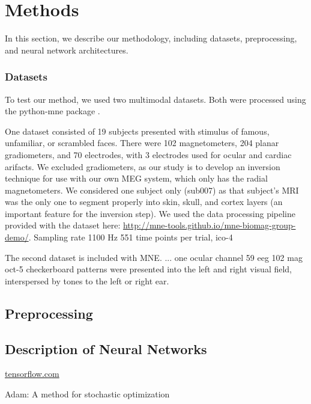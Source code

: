 \documentclass[journal]{IEEEtran}
\begin{document}
\section{Methods}

In this section, we describe our methodology, including datasets, preprocessing, and neural network architectures.

\subsubsection{Datasets}

To test our method, we used two multimodal datasets. Both were processed using the python-mne package \cite{gramfort2014mne}.

One dataset \cite{wakeman2015multi} consisted of 19 subjects presented with stimulus of famous, unfamiliar, or scrambled faces. There were 102 magnetometers, 204 planar gradiometers, and 70 electrodes, with 3 electrodes used for ocular and cardiac arifacts. We excluded gradiometers, as our study is to develop an inversion technique for use with our own MEG system, which only has the radial magnetometers. We considered one subject only (sub007) as that subject's MRI was the only one to segment properly into skin, skull, and cortex layers (an important feature for the inversion step). We used the data processing pipeline provided with the dataset here: \url{http://mne-tools.github.io/mne-biomag-group-demo/}. Sampling rate 1100 Hz 551 time points per trial, ico-4

The second dataset \cite{gramfort2013meg} is included with MNE. ... one ocular channel 59 eeg 102 mag oct-5 checkerboard patterns were presented into the left and right visual field, interspersed by tones to the left or right ear. 

\subsection{Preprocessing}
\subsection{Description of Neural Networks}
\url{tensorflow.com}
\cite{kingma2014adam}

Adam: A method for stochastic optimization
\end{document}

